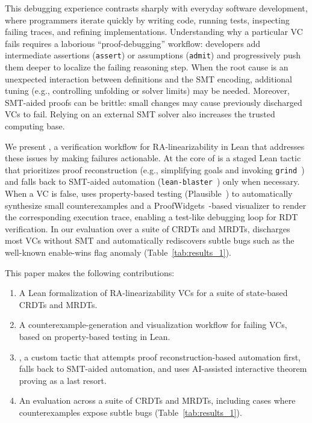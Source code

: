 \documentclass[sigplan,twocolumn,accept]{acmart}
\begin{document}
This debugging experience contrasts sharply with everyday software development, where programmers iterate quickly by writing code, running tests, inspecting failing traces, and refining implementations. Understanding why a particular VC fails requires a laborious ``proof-debugging'' workflow: developers add intermediate assertions (\texttt{assert}) or assumptions (\texttt{admit}) and progressively push them deeper to localize the failing reasoning step. When the root cause is an unexpected interaction between definitions and the SMT encoding, additional tuning (e.g., controlling unfolding or solver limits) may be needed. Moreover, SMT-aided proofs can be brittle: small changes may cause previously discharged VCs to fail. Relying on an external SMT solver also increases the trusted computing base.

We present \sal, a verification workflow for RA-linearizability in Lean that addresses these issues by making failures actionable. At the core of \sal is a staged Lean tactic that prioritizes proof reconstruction (e.g., simplifying goals and invoking \texttt{grind}~\cite{lean_grind}) and falls back to SMT-aided automation (\texttt{lean-blaster}~\cite{lean_blaster}) only when necessary. When a VC is false, \sal uses property-based testing (Plausible~\cite{plausible}) to automatically synthesize small counterexamples and a ProofWidgets~\cite{ayers_et_al:LIPIcs.ITP.2021.4}-based visualizer to render the corresponding execution trace, enabling a test-like debugging loop for RDT verification. In our evaluation over a suite of CRDTs and MRDTs, \sal discharges most VCs without SMT and automatically rediscovers subtle bugs such as the well-known enable-wins flag anomaly (Table~\ref{tab:results_1}).

This paper makes the following contributions:
\begin{enumerate}
    \item A Lean formalization of RA-linearizability VCs for a suite of state-based CRDTs and MRDTs.
    \item A counterexample-generation and visualization workflow for failing VCs, based on property-based testing in Lean.
    \item \sal, a custom tactic that attempts proof reconstruction-based automation first, falls back to SMT-aided automation, and uses AI-assisted interactive theorem proving as a last resort.
    \item An evaluation across a suite of CRDTs and MRDTs, including cases where counterexamples expose subtle bugs (Table~\ref{tab:results_1}).
\end{enumerate}
\end{document}
